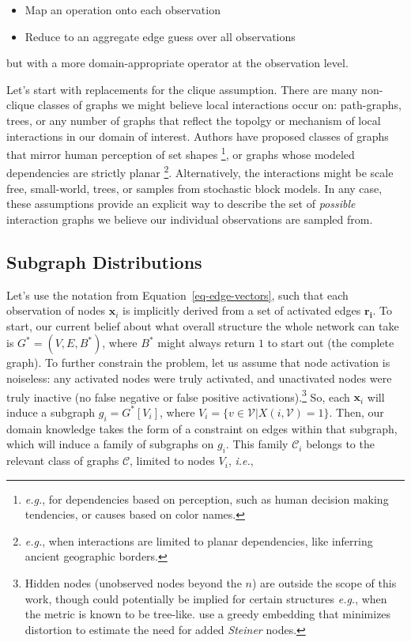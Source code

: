 \documentclass[%
	12pt,
		oneside,
		letterpaper
]{book}
\providecommand{\tightlist}{%
  \setlength{\itemsep}{0pt}\setlength{\parskip}{0pt}}
\begin{document}
\begin{itemize}
\tightlist
\item
  Map an operation onto each observation
\item
  Reduce to an aggregate edge guess over all observations
\end{itemize}

but with a more domain-appropriate operator at the observation level.

Let's start with replacements for the clique assumption. There are many
non-clique classes of graphs we might believe local interactions occur
on: path-graphs, trees, or any number of graphs that reflect the topolgy
or mechanism of local interactions in our domain of interest. Authors
have proposed classes of graphs that mirror human perception of set
shapes \autocite{Relativeneighborhoodgraphs_Jaromczyk1992}\footnote{
  \emph{e.g.}, for dependencies based on perception, such as human
  decision making tendencies, or causes based on color names.}, or
graphs whose modeled dependencies are strictly planar
\autocite{toolfilteringinformation_Tumminello2005}\footnote{
  \emph{e.g.}, when interactions are limited to planar dependencies,
  like inferring ancient geographic borders.}. Alternatively, the
interactions might be scale free, small-world, trees, or samples from
stochastic block
models.\autocite{StochasticblockmodelsFirst_Holland1983} In any case,
these assumptions provide an explicit way to describe the set of
\emph{possible} interaction graphs we believe our individual
observations are sampled from.

\subsection{Subgraph Distributions}\label{sec-subgraph-dists}

Let's use the notation from Equation~\ref{eq-edge-vectors}, such that
each observation of nodes \(\mathbf{x}_i\) is implicitly derived from a
set of activated edges \(\mathbf{r_i}\). To start, our current belief
about what overall structure the whole network can take is
\(G^*=(V,E,B^*)\), where \(B^*\) might always return \(1\) to start out
(the complete graph). To further constrain the problem, let us assume
that node activation is noiseless: any activated nodes were truly
activated, and unactivated nodes were truly inactive (no false negative
or false positive activations).\footnote{ Hidden nodes (unobserved nodes
  beyond the \(n\)) are outside the scope of this work, though could
  potentially be implied for certain structures \emph{e.g.}, when the
  metric is known to be tree-like. \textcite{TreeIam_Sonthalia2020} use
  a greedy embedding that minimizes distortion to estimate the need for
  added \emph{Steiner} nodes.} So, each \(\mathbf{x}_i\) will induce a
subgraph \(g_i = G^*[V_i]\), where
\(V_i = \{v\in \mathcal{V} | X(i,\mathcal{V})=1\}\). Then, our domain
knowledge takes the form of a constraint on edges within that subgraph,
which will induce a family of subgraphs on \(g_i\). This family
\(\mathcal{C}_i\) belongs to the relevant class of graphs
\(\mathcal{C}\), limited to nodes \(V_i\), \emph{i.e.},
\end{document}
